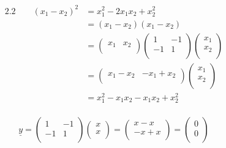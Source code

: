 \documentclass[11pt,a4paper]{article}
\theoremstyle{definition}
\begin{document}
\begin{enumerate}
\begin{align*}
2.2\qquad  (x_1-x_2)^2 & = x_1^2 - 2x_1x_2 + x^2_2\\
& = (x_1 -x_2)(x_1-x_2)\\
& = \begin{pmatrix}
x_1 & x_2\\
\end{pmatrix}
\begin{pmatrix}
1 & -1 \\
-1 & 1\\
\end{pmatrix}\begin{pmatrix}
x_1\\
x_2\\
\end{pmatrix}\\
& = \begin{pmatrix}
x_1-x_2 & -x_1 + x_2\\
\end{pmatrix}\begin{pmatrix}
x_1\\
x_2\\
\end{pmatrix}\\
& = x^2_1 - x_1x_2 -x_1x_2 + x^2_2\\
\end{align*}




\begin{figure}[H]
\centering
{}
\end{figure}



$$\underline{y} = \begin{pmatrix}
1 & -1\\
-1 & 1\\
\end{pmatrix}\begin{pmatrix}
x\\
x\\
\end{pmatrix} = \begin{pmatrix}
x - x\\
-x + x\\
\end{pmatrix}= \begin{pmatrix}
0\\
0\\
\end{pmatrix}$$

\end{enumerate}
\end{document}
